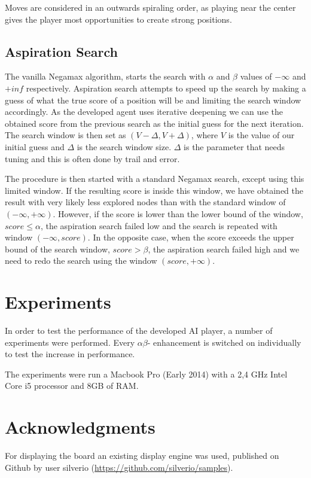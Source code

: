 \documentclass[11pt]{article}
\begin{document}


Moves are considered in an outwards spiraling order, as playing near the center gives the player most opportunities to create strong positions.

\subsection{Aspiration Search}
\label{-subsec:aspirationsearch}
The vanilla Negamax algorithm, starts the search with $\alpha$ and $\beta$ values of $-\infty$ and $+inf$ respectively. Aspiration search attempts to speed up the search by making a guess of what the true score of a position will be and limiting the search window accordingly. As the developed agent uses iterative deepening we can use the obtained score from the previous search as the initial guess for the next iteration. The search window is then set as $(V-\Delta, V+\Delta)$, where $V$ is the value of our initial guess and $\Delta$ is the search window size. $\Delta$ is the parameter that needs tuning and this is often done by trail and error. 

The procedure is then started with a standard Negamax search, except using this limited window. If the resulting score is inside this window, we have obtained the result with very likely less explored nodes than with the standard window of $(-\infty,+\infty)$. However, if the score is lower than the lower bound of the window, \ie $score \leq \alpha$, the aspiration search failed low and the search is repeated with window $(-\infty,score)$. In the opposite case, when the score exceeds the upper bound of the search window, \ie $score > \beta$, the aspiration search failed high and we need to redo the search using the window $(score, +\infty)$.

\section{Experiments}
\label{-sec:experiments}
In order to test the performance of the developed AI player, a number of experiments were performed. Every $\alpha\beta$- enhancement is switched on individually to test the increase in performance. 

The experiments were run a Macbook Pro (Early 2014) with a 2,4 GHz Intel Core i5 processor and 8GB of RAM.


\section{Acknowledgments}
\label{-sec:acknowledgments}
For displaying the board an existing display engine was used, published on Github by user silverio (\url{https://github.com/silverio/samples}).

	\nocite{*}
	\printbibliography
\end{document}
